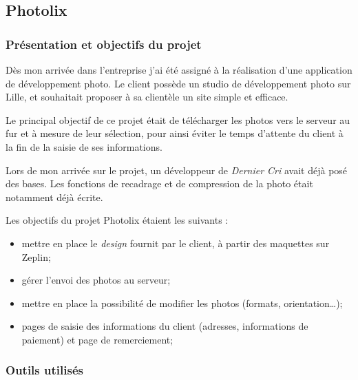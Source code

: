 \subsection{Photolix}\label{photolix}

\subsubsection{Présentation et objectifs du
projet}\label{pruxe9sentation-et-objectifs-du-projet}

\bigskip

Dès mon arrivée dans l'entreprise j'ai été assigné à la réalisation
d'une application de développement photo. Le client possède un studio de
développement photo sur Lille, et souhaitait proposer à sa clientèle un
site simple et efficace.

\bigskip

Le principal objectif de ce projet était de télécharger les photos vers
le serveur au fur et à mesure de leur sélection, pour ainsi éviter le
temps d'attente du client à la fin de la saisie de ses informations.

\bigskip

Lors de mon arrivée sur le projet, un développeur de \emph{Dernier Cri}
avait déjà posé des bases. Les fonctions de recadrage et de compression
de la photo était notamment déjà écrite.

\bigskip

Les objectifs du projet Photolix étaient les suivants :

\begin{itemize}
\tightlist
\item
  mettre en place le \emph{design} fournit par le client, à partir des
  maquettes sur Zeplin;
\item
  gérer l'envoi des photos au serveur;
\item
  mettre en place la possibilité de modifier les photos (formats,
  orientation\ldots{});
\item
  pages de saisie des informations du client (adresses, informations de
  paiement) et page de remerciement;
\end{itemize}

\bigskip

\subsubsection{Outils utilisés}\label{outils-utilisuxe9s}

\bigskip

